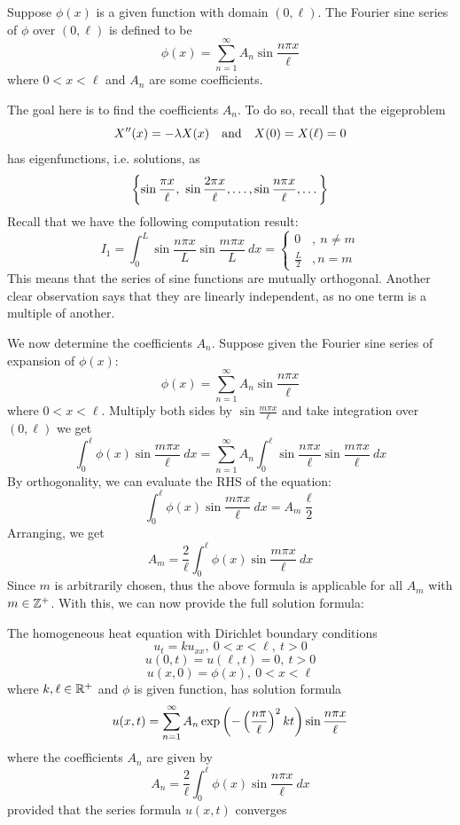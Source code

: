 \medskip 

\begin{defn} 
    Suppose $\phi(x)$ is a given function with domain $(0,\ell)$. The Fourier sine series of $\phi$ over $(0,\ell)$ is defined to be 
    \[\phi(x) = \sum_{n=1}^{\infty} A_n \sin\frac{n\pi x}{\ell}\]
    where $0<x<\ell$ and $A_n$ are some coefficients.
\end{defn}

The goal here is to find the coefficients $A_n$. To do so, recall that the eigeproblem
\[X''(x) = -\lambda X(x) \quad \text{and} \quad X(0) = X(\ell) = 0\]
has eigenfunctions, i.e. solutions, as
\[\left\{\sin \frac{\pi x}{\ell},\ \sin\frac{2\pi x}{\ell} ,\dots, \sin\frac{n\pi x}{\ell}, \dots \right\}\]
Recall that we have the following computation result:
\[I_1 = \int_0^L \sin\frac{n\pi x}{L} \sin\frac{m\pi x}{L}\ dx = 
\begin{cases}
    0 &,\ n\neq m\\
    \frac{L}{2} &, n=m
\end{cases}\]
This means that the series of sine functions are mutually orthogonal. Another clear observation says that they are linearly independent, as no one term is a multiple of another.

We now determine the coefficients $A_n$. Suppose given the Fourier sine series of expansion of $\phi(x)$:
\[\phi(x) = \sum_{n=1}^\infty A_n \sin\frac{n\pi x}{\ell}\]
where $0<x<\ell$. Multiply both sides by $\sin\frac{m\pi x}{\ell}$ and take integration over $(0,\ell)$ we get 
\[\int_0^\ell \phi(x)\sin\frac{m\pi x}{\ell}\ dx = \sum_{n=1}^\infty A_n \int_0^\ell \sin\frac{n\pi x}{\ell} \sin\frac{m\pi x}{\ell}\ dx \]
By orthogonality, we can evaluate the RHS of the equation:
\[\int_0^\ell \phi(x)\sin\frac{m\pi x}{\ell}\ dx = A_m \frac{\ell}{2}\]
Arranging, we get 
\[A_m = \frac{2}{\ell}\int_0^\ell \phi(x)\sin\frac{m\pi x}{\ell}\ dx\]
Since $m$ is arbitrarily chosen, thus the above formula is applicable for all $A_m$ with $m\in{\mathbb Z}^+$. With this, we can now provide the full solution formula:

\medskip 

\begin{thm}
    The homogeneous heat equation with Dirichlet boundary conditions
    \[u_t = ku_{xx},\ 0<x<\ell,\ t>0\]
    \[u(0,t)=u(\ell,t)=0,\ t>0\]
    \[u(x,0) = \phi(x),\ 0<x<\ell\]
    where $k,\ell\in {\mathbb R}^+$ and $\phi$ is given function, has solution formula
    \[u(x,t) = \sum_{n=1}^{\infty} A_n \exp\left(-\left(\frac{n\pi}{\ell}\right)^2 kt\right)\sin \frac{n\pi x}{\ell}\]
    where the coefficients $A_n$ are given by 
    \[A_n = \frac{2}{\ell}\int_0^\ell \phi(x)\sin\frac{n\pi x}{\ell}\ dx\]
    provided that the series formula $u(x,t)$ converges
\end{thm}

